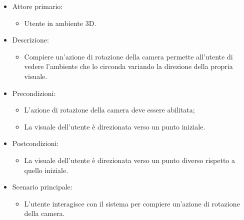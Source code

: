 \begin{itemize}

	\item Attore primario: 
	\begin{itemize}
		\item Utente in ambiente 3D.
	\end{itemize}
	\item Descrizione:
	\begin{itemize}
		\item Compiere un'azione di rotazione della camera permette all'utente di vedere l'ambiente che lo circonda variando la direzione della propria visuale.
	\end{itemize}
	
	\item Precondizioni:
	\begin{itemize}
		\item L'azione di rotazione della camera deve essere abilitata;
		\item La visuale dell'utente è direzionata verso un punto iniziale.
	\end{itemize}
	
	\item Postcondizioni:
	\begin{itemize}
		\item La visuale dell'utente è direzionata verso un punto diverso rispetto a quello iniziale.
	\end{itemize}
	
	\item Scenario principale:
	\begin{itemize}
		\item L'utente interagisce con il sistema per compiere un'azione di rotazione della camera.
	\end{itemize}
	
\end{itemize}

